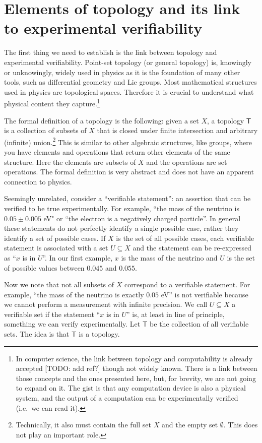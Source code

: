 \documentclass[12pt]{iopart}
\begin{document}
\section{Elements of topology and its link to experimental verifiability}

The first thing we need to establish is the link between topology and experimental verifiability. Point-set topology (or general topology) is, knowingly or unknowingly, widely used in physics as it is the foundation of many other tools, such as differential geometry and Lie groups. Most mathematical structures used in physics are topological spaces. Therefore it is crucial to understand what physical content they capture.\footnote{In computer science, the link between topology and computability is already accepted [TODO: add ref?] though not widely known. There is a link between those concepts and the ones presented here, but, for brevity, we are not going to expand on it. The gist is that any computation device is also a physical system, and the output of a computation can be experimentally verified (i.e.~we can read it).}

The formal definition of a topology is the following: given a set $X$, a topology $\mathsf{T}$ is a collection of subsets of $X$ that is closed under finite intersection and arbitrary (infinite) union.\footnote{Technically, it also must contain the full set $X$ and the empty set $\emptyset$. This does not play an important role.} This is similar to other algebraic structures, like groups, where you have elements and operations that return other elements of the same structure. Here the elements are subsets of $X$ and the operations are set operations. The formal definition is very abstract and does not have an apparent connection to physics.

Seemingly unrelated, consider a ``verifiable statement'': an assertion that can be verified to be true experimentally. For example, ``the mass of the neutrino is $0.05 \pm 0.005$ eV" or ``the electron is a negatively charged particle''. In general these statements do not perfectly identify a single possible case, rather they identify a set of possible cases. If $X$ is the set of all possible cases, each verifiable statement is associated with a set $U \subseteq X$ and the statement can be re-expressed as ``$x$ is in $U$''. In our first example, $x$ is the mass of the neutrino and $U$ is the set of possible values between $0.045$ and $0.055$.

Now we note that not all subsets of $X$ correspond to a verifiable statement. For example, ``the mass of the neutrino is exactly $0.05$ eV'' is not verifiable because we cannot perform a measurement with infinite precision. We call $U \subseteq X$ a verifiable set if the statement ``$x$ is in $U$'' is, at least in line of principle, something we can verify experimentally. Let $\mathsf{T}$ be the collection of all verifiable sets. The idea is that $\mathsf{T}$ is a topology.
\end{document}
